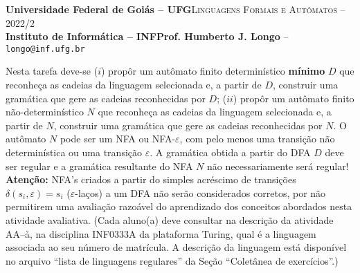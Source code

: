 \documentclass[12pt]{article}
\def\ua{07}
\begin{document}
 \begin{tcolorbox}[rounded corners, colback=blue!3, colframe=blue!40!black]
  \footnotesize\textbf{Universidade Federal de Goiás -- UFG}\hfill \textsc{Linguagens Formais e Autômatos -- 2022/2}\\
  \footnotesize\textbf{Instituto de Informática -- INF\hfill Prof. Humberto J. Longo} -- \scriptsize\texttt{longo@inf.ufg.br}
 \end{tcolorbox}\bigskip
%
\begin{tcolorbox}[rounded corners, colback=blue!2, colframe=blue!40!black, title=\textbf{Atividade AA-\ua}]
 Nesta tarefa deve-se ($i$) propôr um autômato finito determinístico \textbf{mínimo} $D$ que reconheça as cadeias da linguagem selecionada e, a partir de $D$, construir uma gramática que gere as cadeias reconhecidas por $D$; ($ii$)  propôr um autômato finito não-determinístico $N$ que reconheça as cadeias da linguagem selecionada e, a partir de $N$, construir uma gramática que gere as cadeias reconhecidas por $N$. O autômato $N$ pode ser um NFA ou NFA-$\varepsilon$, com pelo menos uma transição não determinística ou uma transição $\varepsilon$. A gramática obtida a partir do DFA $D$ deve ser regular e a gramática resultante do NFA $N$ não necessariamente será regular! \textbf{Atenção:} NFA's criados a partir do simples acréscimo de transições $\delta(s_i,\varepsilon)=s_i$ ($\varepsilon$-laços) a um DFA não serão considerados corretos, por não permitirem uma avaliação razoável do aprendizado dos conceitos abordados nesta atividade avaliativa. (Cada aluno(a) deve consultar na descrição da atividade AA--\aa, na disciplina INF0333A da plataforma Turing, qual é a linguagem associada ao seu número de matrícula. A descrição da linguagem está disponível no arquivo ``lista de linguagens regulares'' da Seção ``Coletânea de exercícios''.)
\end{tcolorbox}\bigskip
\end{document}
